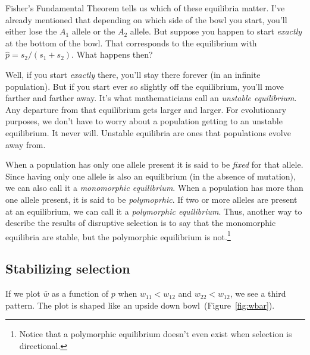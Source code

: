 Fisher's Fundamental Theorem tells us which of these equilibria
matter. I've already mentioned that depending on which side of the
bowl you start, you'll either lose the $A_1$ allele or the $A_2$
allele. But suppose you happen to start {\it exactly\/} at the bottom
of the bowl. That corresponds to the equilibrium with $\hat p =
s_2/(s_1+s_2)$. What happens then?

Well, if you start {\it exactly\/} there, you'll stay there forever
(in an infinite population). But if you start ever so slightly off the
equilibrium, you'll move farther and farther away. It's what
mathematicians call an {\it unstable equilibrium}. Any departure from
that equilibrium gets larger and larger. For evolutionary purposes, we
don't have to worry about a population getting to an unstable
equilibrium. It never will. Unstable equilibria are ones that
populations evolve away from.

When a population has only one allele present it is said to be {\it
  fixed\/} for that allele. Since having only one allele is also an
equilibrium (in the absence of mutation), we can also call it a {\it
  monomorphic equilibrium}. When a population has more than one allele
present, it is said to be {\it polymoprhic}. If two or more alleles
are present at an equilibrium, we can call it a {\it polymorphic
  equilibrium}. Thus, another way to describe the results of
disruptive selection is to say that the monomorphic equilibria are
stable, but the polymorphic equilibrium is not.\footnote{Notice that a
  polymorphic equilibrium doesn't even exist when selection is
  directional.}

\subsection*{Stabilizing selection}

If we plot $\bar w$ as a function of $p$ when $w_{11} < w_{12}$ and
$w_{22} < w_{12}$, we see a third pattern. The plot is shaped like an
upside down bowl~(Figure~\ref{fig:wbar}).


